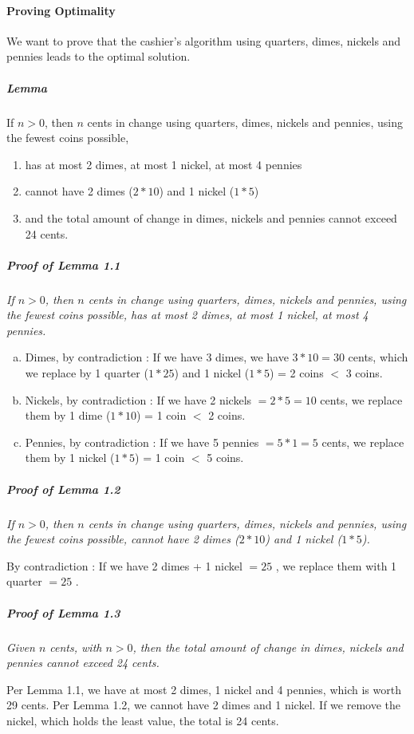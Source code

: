 \documentclass[10pt,a4paper]{book}
\begin{document}
\paragraph*{Proving Optimality}
We want to prove that the cashier's algorithm using quarters, dimes, nickels and pennies leads to the optimal solution.
\subparagraph*{Lemma}
If $n > 0$, then $n$ cents in change using quarters, dimes, nickels and pennies, using the fewest coins possible, 
\begin{enumerate}
\item has at most 2 dimes, at most 1 nickel, at most 4 pennies
\item cannot have 2 dimes ($2*10$\textcent) and 1 nickel ($1*5$\textcent)
\item and the total amount of change in dimes, nickels and pennies cannot exceed 24 cents.
\end{enumerate}
\subparagraph*{Proof of Lemma 1.1}
\textit{If $n > 0$, then $n$ cents in change using quarters, dimes, nickels and pennies, using the fewest coins possible, has at most 2 dimes, at most 1 nickel, at most 4 pennies.}
\begin{enumerate}[(a)]
\item Dimes, by contradiction : If we have 3 dimes, we have $3*10 = 30$ cents, which we replace by 1 quarter ($1*25$\textcent) and 1 nickel ($1*5$\textcent) = 2 coins $<$ 3 coins.
\item Nickels, by contradiction : If we have 2 nickels $= 2*5 = 10$ cents, we replace them by 1 dime ($1*10$\textcent) = 1 coin $<$ 2 coins.
\item Pennies, by contradiction : If we have 5 pennies $= 5*1 = 5$ cents, we replace them by 1 nickel ($1*5$\textcent) = 1 coin $<$ 5 coins. 
\end{enumerate}
\subparagraph*{Proof of Lemma 1.2}
\textit{If $n > 0$, then $n$ cents in change using quarters, dimes, nickels and pennies, using the fewest coins possible, cannot have 2 dimes ($2*10$\textcent) and 1 nickel ($1*5$\textcent).}\par
By contradiction : If we have 2 dimes + 1 nickel $= 25$ \textcent, we replace them with 1 quarter $= 25$ \textcent.
\subparagraph*{Proof of Lemma 1.3}
\textit{Given $n$ cents, with $n > 0$, then the total amount of change in dimes, nickels and pennies cannot exceed 24 cents.}\par
Per Lemma 1.1, we have at most 2 dimes, 1 nickel and 4 pennies, which is worth 29 cents. Per Lemma 1.2, we cannot have 2 dimes and 1 nickel. If we remove the nickel, which holds the least value, the total is 24 cents.
\end{document}
